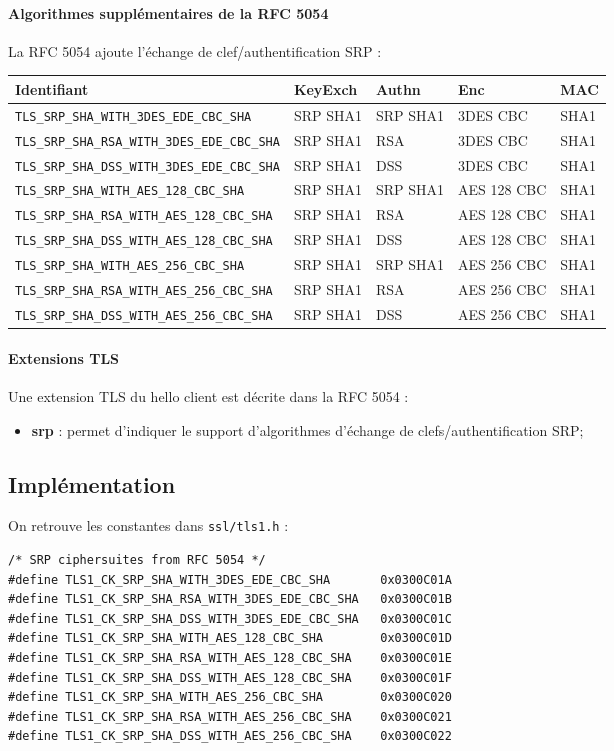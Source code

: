 \documentclass[a4paper,11pt,french]{article}
\begin{document}
\paragraph{Algorithmes supplémentaires de la RFC 5054} 
La RFC 5054 ajoute l'échange de clef/authentification SRP :
\begin{center}
\begin{tabularx}{17cm}{|l|l|l|X|l|}
\hline
\textbf{Identifiant} & \textbf{KeyExch} & \textbf{Authn}& \textbf{Enc}& \textbf{MAC}\\
\hline
\verb+TLS_SRP_SHA_WITH_3DES_EDE_CBC_SHA+&SRP SHA1&SRP SHA1&3DES CBC&SHA1\\
\hline
\verb+TLS_SRP_SHA_RSA_WITH_3DES_EDE_CBC_SHA+&SRP SHA1&RSA&3DES CBC&SHA1\\
\hline
\verb+TLS_SRP_SHA_DSS_WITH_3DES_EDE_CBC_SHA+&SRP SHA1&DSS&3DES CBC&SHA1\\
\hline
\verb+TLS_SRP_SHA_WITH_AES_128_CBC_SHA+&SRP SHA1&SRP SHA1&AES 128 CBC&SHA1\\
\hline
\verb+TLS_SRP_SHA_RSA_WITH_AES_128_CBC_SHA+&SRP SHA1&RSA&AES 128 CBC&SHA1\\
\hline
\verb+TLS_SRP_SHA_DSS_WITH_AES_128_CBC_SHA+&SRP SHA1&DSS&AES 128 CBC&SHA1\\
\hline
\verb+TLS_SRP_SHA_WITH_AES_256_CBC_SHA+&SRP SHA1&SRP SHA1&AES 256 CBC&SHA1\\
\hline
\verb+TLS_SRP_SHA_RSA_WITH_AES_256_CBC_SHA+&SRP SHA1&RSA&AES 256 CBC&SHA1\\
\hline
\verb+TLS_SRP_SHA_DSS_WITH_AES_256_CBC_SHA+&SRP SHA1&DSS&AES 256 CBC&SHA1\\
\hline
\end{tabularx}
\end{center}

\paragraph{Extensions TLS}
Une extension TLS du hello client est décrite dans la RFC 5054 :
\begin{itemize}
\item \textbf{srp} : permet d'indiquer le support d'algorithmes d'échange de clefs/authentification SRP;
\end{itemize}

\subsection{Implémentation}

On retrouve les constantes dans \verb+ssl/tls1.h+ : 
\begin{verbatim}
/* SRP ciphersuites from RFC 5054 */
#define TLS1_CK_SRP_SHA_WITH_3DES_EDE_CBC_SHA       0x0300C01A
#define TLS1_CK_SRP_SHA_RSA_WITH_3DES_EDE_CBC_SHA   0x0300C01B
#define TLS1_CK_SRP_SHA_DSS_WITH_3DES_EDE_CBC_SHA   0x0300C01C
#define TLS1_CK_SRP_SHA_WITH_AES_128_CBC_SHA        0x0300C01D
#define TLS1_CK_SRP_SHA_RSA_WITH_AES_128_CBC_SHA    0x0300C01E
#define TLS1_CK_SRP_SHA_DSS_WITH_AES_128_CBC_SHA    0x0300C01F
#define TLS1_CK_SRP_SHA_WITH_AES_256_CBC_SHA        0x0300C020
#define TLS1_CK_SRP_SHA_RSA_WITH_AES_256_CBC_SHA    0x0300C021
#define TLS1_CK_SRP_SHA_DSS_WITH_AES_256_CBC_SHA    0x0300C022
\end{verbatim}
\end{document}
